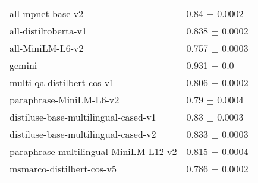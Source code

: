 \begin{table}[h!]
{\begin{tabular}{ll}
                    all-mpnet-base-v2 &                  0.84 $\pm$ 0.0002 \\
                 all-distilroberta-v1 &                 0.838 $\pm$ 0.0002 \\
                     all-MiniLM-L6-v2 &                 0.757 $\pm$ 0.0003 \\
                               gemini &                    0.931 $\pm$ 0.0 \\
           multi-qa-distilbert-cos-v1 &                 0.806 $\pm$ 0.0002 \\
              paraphrase-MiniLM-L6-v2 &                  0.79 $\pm$ 0.0004 \\
 distiluse-base-multilingual-cased-v1 &                  0.83 $\pm$ 0.0003 \\
 distiluse-base-multilingual-cased-v2 &                 0.833 $\pm$ 0.0003 \\
paraphrase-multilingual-MiniLM-L12-v2 &                 0.815 $\pm$ 0.0004 \\
            msmarco-distilbert-cos-v5 &                 0.786 $\pm$ 0.0002 \\

\end{tabular}}
\end{table}
